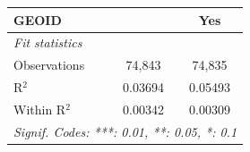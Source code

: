 \begin{tabular}{lcc}
   GEOID                                                               &                & Yes\\  
   \midrule
   \emph{Fit statistics}\\
   Observations                                                        & 74,843         & 74,835\\  
   R$^2$                                                               & 0.03694        & 0.05493\\  
   Within R$^2$                                                        & 0.00342        & 0.00309\\  
   \midrule \midrule
   \multicolumn{3}{l}{\emph{Signif. Codes: ***: 0.01, **: 0.05, *: 0.1}}\\
\end{tabular}
\par\endgroup
\begingroup
\centering
